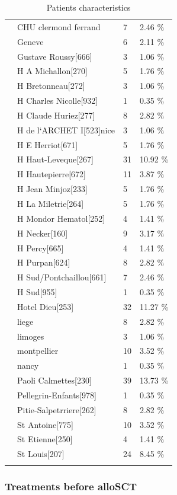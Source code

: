 \documentclass[a4paper,11pt] {article}
\begin{document}
\begin{longtable}{llll}
   & CHU clermond ferrand & 7 & 2.46 \% \\ 
   & Geneve & 6 & 2.11 \% \\ 
   & Gustave Roussy[666] & 3 & 1.06 \% \\ 
   & H A Michallon[270] & 5 & 1.76 \% \\ 
   & H Bretonneau[272] & 3 & 1.06 \% \\ 
   & H Charles Nicolle[932] & 1 & 0.35 \% \\ 
   & H Claude Huriez[277] & 8 & 2.82 \% \\ 
   & H de l`ARCHET I[523]nice & 3 & 1.06 \% \\ 
   & H E Herriot[671] & 5 & 1.76 \% \\ 
   & H Haut-Leveque[267] & 31 & 10.92 \% \\ 
   & H Hautepierre[672] & 11 & 3.87 \% \\ 
   & H Jean Minjoz[233] & 5 & 1.76 \% \\ 
   & H La Miletrie[264] & 5 & 1.76 \% \\ 
   & H Mondor Hematol[252] & 4 & 1.41 \% \\ 
   & H Necker[160] & 9 & 3.17 \% \\ 
   & H Percy[665] & 4 & 1.41 \% \\ 
   & H Purpan[624] & 8 & 2.82 \% \\ 
   & H Sud/Pontchaillou[661] & 7 & 2.46 \% \\ 
   & H Sud[955] & 1 & 0.35 \% \\ 
   & Hotel Dieu[253] & 32 & 11.27 \% \\ 
   & liege & 8 & 2.82 \% \\ 
   & limoges & 3 & 1.06 \% \\ 
   & montpellier & 10 & 3.52 \% \\ 
   & nancy & 1 & 0.35 \% \\ 
   & Paoli Calmettes[230] & 39 & 13.73 \% \\ 
   & Pellegrin-Enfants[978] & 1 & 0.35 \% \\ 
   & Pitie-Salpetrriere[262] & 8 & 2.82 \% \\ 
   & St Antoine[775] & 10 & 3.52 \% \\ 
   & St Etienne[250] & 4 & 1.41 \% \\ 
   & St Louis[207] & 24 & 8.45 \% \\ 
   \hline
\hline
\caption{Patients characteristics} 
\label{tab:condi}
\end{longtable} \subsubsection{Treatments before alloSCT}
\end{document}
